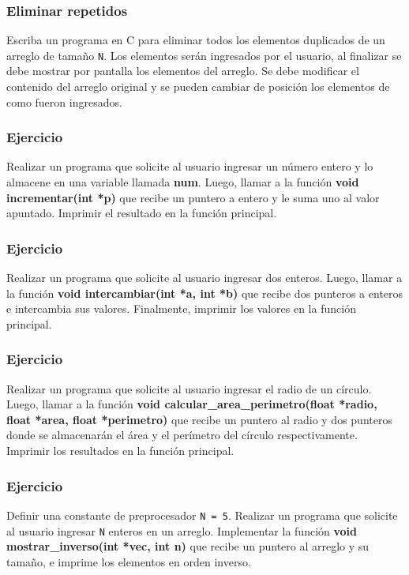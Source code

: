 \subsubsection{Eliminar repetidos}
Escriba un programa en C para eliminar todos los elementos duplicados de un arreglo de tamaño \texttt{N}.
Los elementos serán ingresados por el usuario, al finalizar se debe mostrar por pantalla los elementos del arreglo.
Se debe modificar el contenido del arreglo original y se pueden cambiar de posición los elementos de como fueron ingresados.

\lstset{inputencoding=utf8/latin1}


{\small
  \lstset{inputencoding=utf8/latin1}
  
}

\subsubsection{Ejercicio}
Realizar un programa que solicite al usuario ingresar un número entero y lo almacene en una variable llamada \textbf{num}. Luego, llamar a la función \textbf{void incrementar(int *p)} que recibe un puntero a entero y le suma uno al valor apuntado. Imprimir el resultado en la función principal.

\subsubsection{Ejercicio}
Realizar un programa que solicite al usuario ingresar dos enteros. Luego, llamar a la función \textbf{void intercambiar(int *a, int *b)} que recibe dos punteros a enteros e intercambia sus valores. Finalmente, imprimir los valores en la función principal.

\subsubsection{Ejercicio}
Realizar un programa que solicite al usuario ingresar el radio de un círculo. Luego, llamar a la función \textbf{void calcular\_area\_perimetro(float *radio, float *area, float *perimetro)} que recibe un puntero al radio y dos punteros donde se almacenarán el área y el perímetro del círculo respectivamente. Imprimir los resultados en la función principal.

\subsubsection{Ejercicio}
Definir una constante de preprocesador \texttt{N = 5}. Realizar un programa que solicite al usuario ingresar \texttt{N} enteros en un arreglo. Implementar la función \textbf{void mostrar\_inverso(int *vec, int n)} que recibe un puntero al arreglo y su tamaño, e imprime los elementos en orden inverso.

